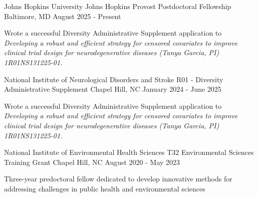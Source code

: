 

\begin{cventries}

\cventry
{Johns Hopkins University} %
{Johns Hopkins Provost Postdoctoral Fellowship} %
{Baltimore, MD} %
{August 2025 - Present} %
{
\begin{cvitems} %
\item Wrote a successful Diversity Administrative Supplement application to \textit{Developing a robust and efficient strategy for \newline censored covariates to improve clinical trial design for neurodegenerative diseases (Tanya Garcia, PI) 1R01NS131225-01.} 
  \end{cvitems}
}

\cventry
{National Institute of Neurological Disorders and Stroke} %
{R01 - Diversity Administrative Supplement} %
{Chapel Hill, NC} %
{January 2024 - June 2025} %
{
\begin{cvitems} %
\item Wrote a successful Diversity Administrative Supplement application to \textit{Developing a robust and efficient strategy for \newline censored covariates to improve clinical trial design for neurodegenerative diseases (Tanya Garcia, PI) 1R01NS131225-01.} 
  \end{cvitems}
}

\cventry
{National Institute of Environmental Health Sciences} %
{T32 Environmental Sciences Training Grant} %
{Chapel Hill, NC} %
{August 2020 - May 2023} %
{
\begin{cvitems} %
\item Three-year predoctoral fellow dedicated to develop innovative methods for addressing challenges \newline in public health and environmental sciences 
  \end{cvitems}
}


\end{cventries}
